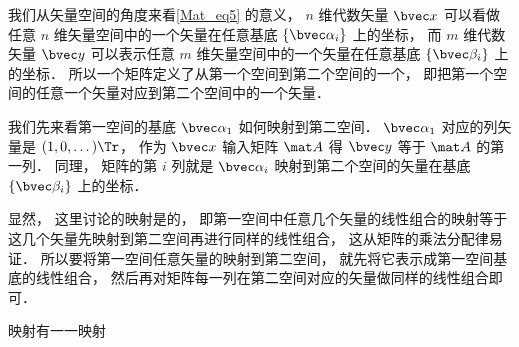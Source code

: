
我们从矢量空间的角度来看\autoref{Mat_eq5} 的意义， $n$ 维代数矢量 $\bvec x$ 可以看做任意 $n$ 维矢量空间中的一个矢量在任意基底 $\{\bvec \alpha_i\}$ 上的坐标， 而 $m$ 维代数矢量 $\bvec y$ 可以表示任意 $m$ 维矢量空间中的一个矢量在任意基底 $\{\bvec \beta_i\}$ 上的坐标． 所以一个矩阵定义了从第一个空间到第二个空间的一个， 即把第一个空间的任意一个矢量对应到第二个空间中的一个矢量． 

我们先来看第一空间的基底 $\bvec \alpha_1$ 如何映射到第二空间． $\bvec\alpha_1$ 对应的列矢量是 $(1, 0, \dots)\Tr$， 作为 $\bvec x$ 输入矩阵 $\mat A$ 得 $\bvec y$ 等于 $\mat A$ 的第一列． 同理， 矩阵的第 $i$ 列就是 $\bvec\alpha_i$ 映射到第二个空间的矢量在基底 $\{\bvec \beta_i\}$ 上的坐标．

显然， 这里讨论的映射是的， 即第一空间中任意几个矢量的线性组合的映射等于这几个矢量先映射到第二空间再进行同样的线性组合， 这从矩阵的乘法分配律易证． 所以要将第一空间任意矢量的映射到第二空间， 就先将它表示成第一空间基底的线性组合， 然后再对矩阵每一列在第二空间对应的矢量做同样的线性组合即可．

映射有一一映射




